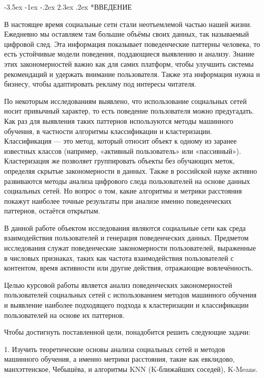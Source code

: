 \documentclass[14pt, a4paper]{extarticle}
\makeatletter
\renewcommand\section{\@startsection {section}{1}{\z@}%
                                   {-3.5ex \@plus -1ex \@minus -.2ex}%
                                   {2.3ex \@plus.2ex}%
                                   {\centering\normalfont\Large\bfseries}}
\makeatother
\begin{document}
\section*{ВВЕДЕНИЕ}

В настоящее время социальные сети стали неотъемлемой частью нашей жизни. Ежедневно мы оставляем там большие объёмы своих данных, 
так называемый цифровой след. Эта информация показывает поведенческие паттерны человека, то есть устойчивые модели поведения, 
поддающиеся выявлению и анализу. Знание этих закономерностей важно как для самих платформ, чтобы улучшить системы рекомендаций 
и удержать внимание пользователя. Также эта информация нужна и бизнесу, чтобы адаптировать рекламу под интересы читателя.

По некоторым исследованиям выявлено, что использование социальных сетей носит привычный характер, то есть поведение пользователя
можно предугадать. Как раз для выявления таких паттернов используются методы машинного обучения, в частности алгоритмы классификации
и кластеризации. Классификация --- это метод, который относит объект к одному из заранее известных классов (например, «активный пользователь» или «пассивный»). Кластеризация же позволяет группировать объекты без обучающих меток, определяя скрытые закономерности в данных.
 Также в российской науке активно развиваются методы анализа цифрового следа пользователей на основе данных социальных сетей.
Но вопрос о том, какие алгоритмы и метрики расстояния покажут наиболее точные результаты при анализе именно поведенческих паттернов, остаётся открытым.

В данной работе объектом исследования являются социальные сети как среда взаимодействия пользователей и генерация поведенческих данных.
Предметом исследования служат поведенческие закономерности пользователей, выраженные в числовых признаках, таких как частота
взаимодействия пользователей с контентом, время активности или другие действия, отражающие вовлечённость.

Целью курсовой работы является анализ поведенческих закономерностей пользователей социальных сетей с использованием методов машинного
обучения и выявление наиболее подходящего подхода к кластеризации и классификации пользователей на основе их паттернов.

Чтобы достигнуть поставленной цели, понадобится решить следующие задачи:

1. Изучить теоретические основы анализа социальных сетей и методов машинного обучения, а именно метрики расстояния, такие как евклидово,
манхэттенское, Чебышёва, и алгоритмы KNN (K‑ближайших соседей), K‑Means.
\end{document}
